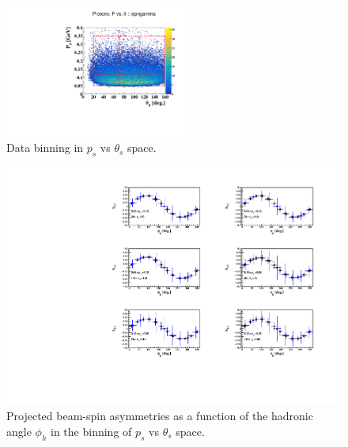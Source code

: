 \begin{figure}[htb]
  \centering
\includegraphics[width=0.55\textwidth,clip,trim=0mm 0mm 0mm 
   20mm]{figs_epngamma/pdf/epngamma_p_p_theta.pdf}
  \caption{Data binning in $p_s$ vs $\theta_s$ space.
   \label{fig:binning_x_t}}
\end{figure}

\begin{figure}[htb]
  \centering
    \includegraphics[width=1.1\textwidth,clip]{figs_epngamma/pdf/epngamma_BSA_incoherent_Phi.pdf}
  \caption{Projected beam-spin asymmetries as a function of the hadronic angle 
   $\phi_h$ in the binning of $p_s$ vs $\theta_s$ space.
   \label{fig:alu_semi}}
\end{figure}



